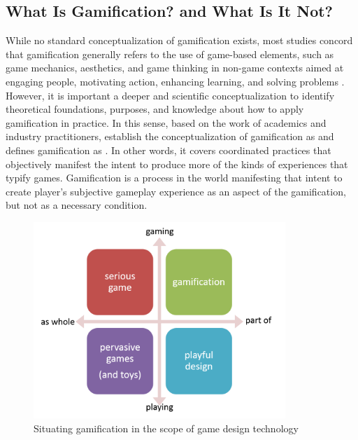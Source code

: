 \subsection{What Is Gamification? and What Is It Not?}

While no standard conceptualization of gamification exists, most studies concord that gamification generally refers to the use of game-based elements, such as game mechanics, aesthetics, and game thinking in non-game contexts aimed at engaging people, motivating action, enhancing learning, and solving problems \cite{BorgesDurelliReisIsotani2014,  Kapp2012}.
However, it is important a deeper and scientific conceptualization to identify theoretical foundations, purposes, and knowledge about how to apply gamification in practice.
In this sense, based on the work of academics and industry practitioners,  establish the conceptualization of gamification as  and  defines gamification as .
In other words, it covers coordinated practices that objectively manifest the intent to produce more of the kinds of experiences that typify games.
Gamification is a process in the world manifesting that intent to create player's subjective gameplay experience as an aspect of the gamification, but not as a necessary condition.

\begin{figure}[htb]
 \caption{Situating gamification in the scope of game design technology}
 \label{fig:game-design-technology}
 \centering
 \includegraphics[width=0.85\textwidth]{images/chap-general-background/game-design-technology.png}
\end{figure}


